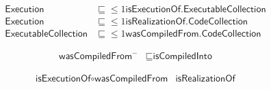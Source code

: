 \documentclass{article}
\begin{document}
\begin{align}
\textsf{Execution} &\sqsubseteq \leq 1 \textsf{isExecutionOf}.\textsf{ExecutableCollection} \\
\textsf{Execution} &\sqsubseteq \leq 1 \textsf{isRealizationOf}.\textsf{CodeCollection} \\
\textsf{ExecutableCollection} &\sqsubseteq \leq 1 \textsf{wasCompiledFrom}.\textsf{CodeCollection}
\end{align}

\begin{align}
\textsf{wasCompiledFrom}^- &\sqsubseteq \textsf{isCompiledInto}
\end{align}

\begin{align}
\textsf{isExecutionOf} \circ \textsf{wasCompiledFrom} & \textsf{isRealizationOf}
\end{align}
 
\end{document}
